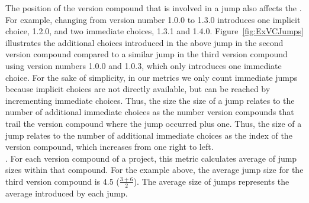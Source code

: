 \documentclass[conference]{IEEEtran}
\begin{document}
The position of the version compound that is involved in a jump also affects the \numberichoices. 
For example, changing from version number 1.0.0 to 1.3.0 introduces one implicit choice, 1.2.0, and two immediate choices, 1.3.1 and 1.4.0. 
Figure~\ref{fig:ExVCJumps} illustrates the additional choices introduced in the above jump in the second version compound compared to a similar jump in the third version compound using version numbers 1.0.0 and 1.0.3, which only introduces one immediate choice. 
For the sake of simplicity, in our metrics we only count immediate jumps because implicit choices are not directly available, but can be reached by incrementing immediate choices.
Thus, the size the size of a jump relates to the number of additional immediate choices as the number version compounds that trail the version compound where the jump occurred plus one. 
Thus, the size of a jump relates to the number of additional immediate choices as the index of the version compound, which increases from one right to left. \\

  
. For each version compound of a project, this metric calculates average of  jump sizes within that compound. 
For the example above, the average jump size for the third version compound is 4.5 ($\frac{ 3 + 6 }{2}$).
The average size of jumps represents the average \numberchoices introduced by each jump. 
\\
 

 


\end{document}
